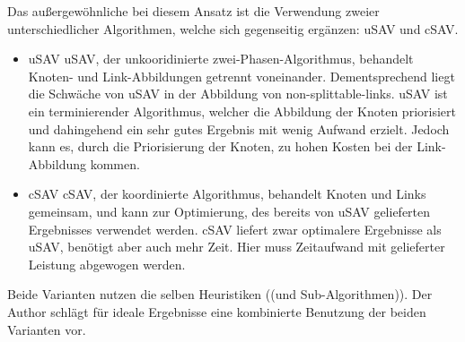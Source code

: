 \documentclass{lni}
\begin{document}
Das außergewöhnliche bei diesem Ansatz ist die Verwendung zweier unterschiedlicher Algorithmen, welche sich gegenseitig ergänzen: uSAV und cSAV.
\begin{itemize}
	\item uSAV \newline
	uSAV, der unkooridinierte zwei-Phasen-Algorithmus, behandelt Knoten- und Link-Abbildungen getrennt voneinander. Dementsprechend liegt die Schwäche von uSAV in der Abbildung von non-splittable-links. uSAV ist ein terminierender Algorithmus, welcher die Abbildung der Knoten priorisiert und dahingehend ein sehr gutes Ergebnis mit wenig Aufwand erzielt. Jedoch kann es, durch die Priorisierung der Knoten, zu hohen Kosten bei der Link-Abbildung kommen.

	\item cSAV \newline
	cSAV, der koordinierte Algorithmus, behandelt Knoten und Links gemeinsam, und kann zur Optimierung, des bereits von uSAV gelieferten Ergebnisses verwendet werden. cSAV liefert zwar optimalere Ergebnisse als uSAV, benötigt aber auch mehr Zeit. Hier muss Zeitaufwand mit gelieferter Leistung abgewogen werden.

\end{itemize} 

Beide Varianten nutzen die selben Heuristiken ((und Sub-Algorithmen)). Der Author schlägt für ideale Ergebnisse eine kombinierte Benutzung der beiden Varianten vor.
\end{document}

